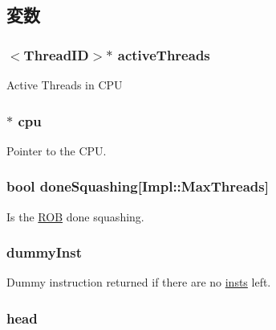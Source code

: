 \subsection{変数}
\hypertarget{classROB_af6eaea53db532812052f71bf0380dab5}{
\subsubsection[{activeThreads}]{$<${\bf ThreadID}$>$$\ast$ {\bf activeThreads}}}
\label{classROB_af6eaea53db532812052f71bf0380dab5}
Active Threads in CPU \hypertarget{classROB_a1379cf882a12ac6fc9eba5da7c84b18b}{
\subsubsection[{cpu}]{$\ast$ {\bf cpu}}}
\label{classROB_a1379cf882a12ac6fc9eba5da7c84b18b}
Pointer to the CPU. \hypertarget{classROB_aa5d029365d2db19432b68bc048d8773d}{
\subsubsection[{doneSquashing}]{\setlength{\rightskip}{0pt plus 5cm}bool {\bf doneSquashing}\mbox{[}Impl::MaxThreads\mbox{]}}}
\label{classROB_aa5d029365d2db19432b68bc048d8773d}
Is the \hyperlink{classROB}{ROB} done squashing. \hypertarget{classROB_a3f3e1afdb445d65050c39300f93716d2}{
\subsubsection[{dummyInst}]{ {\bf dummyInst}}}
\label{classROB_a3f3e1afdb445d65050c39300f93716d2}
Dummy instruction returned if there are no \hyperlink{namespaceinsts}{insts} left. \hypertarget{classROB_ae6c12b73bfe6227eded2623bf432805b}{
\subsubsection[{head}]{ {\bf head}}}
